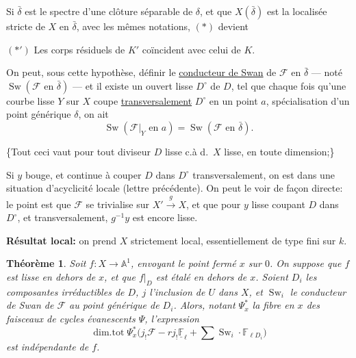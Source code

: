 \documentclass[11pt,a4paper]{article}
\theoremstyle{plain}
\newtheorem{theorem}{Th\'eor\`eme}
\theoremstyle{definition}
\DeclareMathOperator{\Sw}{Sw}
\DeclareMathOperator{\dimtot}{dim.tot}
\begin{document}
\medskip

Si $\bar{\delta}$ est le spectre d'une cl\^oture s\'eparable de $\delta$, et que $X(\bar{\delta})$ est la localis\'ee stricte de $X$ en $\bar{\delta}$, avec les m\^emes notations, $(*)$ devient

$(*')$ Les corps r\'esiduels de $K'$ co\"incident avec celui de $K$.

\medskip

On peut, sous cette hypoth\`ese, d\'efinir le \underline{conducteur de Swan} de $\mathcal{F}$ en $\bar{\delta}$ --- not\'e $\Sw(\mathcal{F} \text{ en } \bar{\delta})$ --- et il existe un ouvert lisse $D^\circ$ de $D$, tel que chaque fois qu'une courbe lisse $Y$ sur $X$ coupe \underline{transversalement} $D^\circ$ en un point $a$, sp\'ecialisation d'un point g\'en\'erique $\delta$, on ait
\[
\Sw(\mathcal{F}|_Y \text{ en } a) = \Sw(\mathcal{F} \text{ en } \bar{\delta}).
\]

\begin{flushright}
\begin{minipage}{0.5\textwidth}
\{Tout ceci vaut pour tout diviseur $D$ lisse c.\`a d.\ $X$ lisse, en toute dimension;\}
\end{minipage}
\end{flushright}

\newpage

Si $y$ bouge, et continue \`a couper $D$ dans $D^\circ$ transversalement, on est dans une situation d'acyclicit\'e locale (lettre pr\'ec\'edente). On peut le voir de fa\c{c}on directe: le point est que $\mathcal{F}$ se trivialise sur $X' \xrightarrow{g} X$, et que pour $y$ lisse coupant $D$ dans $D^\circ$, et transversalement, $g^{-1}y$ est encore lisse.

\medskip

\noindent \textbf{R\'esultat local:} on prend $X$ strictement local, essentiellement de type fini sur $k$.

\begin{theorem}
Soit $f: X \to \mathbb{A}^1$, envoyant le point ferm\'e $x$ sur $0$. On suppose que $f$ est lisse en dehors de $x$, et que $f|_D$ est \'etal\'e en dehors de $x$. Soient $D_i$ les composantes irr\'eductibles de $D$, $j$ l'inclusion de $U$ dans $X$, et $\Sw_i$ le conducteur de Swan de $\mathcal{F}$ au point g\'en\'erique de $D_i$. Alors, notant $\Psi_x^*$ la fibre en $x$ des faisceaux de cycles \'evanescents $\Psi$, l'expression
\[
\dimtot \Psi_x^* \bigl(j_! \mathcal{F} - r j_! \underline{\mathbb{F}}_\ell + \sum \Sw_i \cdot \mathbb{F}_{\ell D_i}\bigr)
\]
est ind\'ependante de $f$.
\end{theorem}
\end{document}
